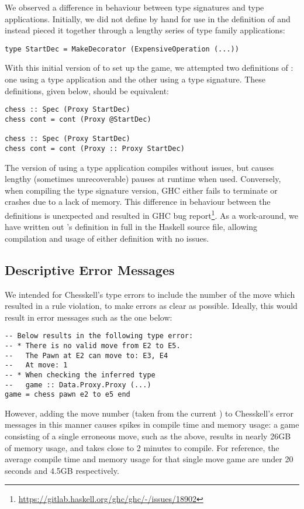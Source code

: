 We observed a difference in behaviour between type signatures and type applications. Initially, we did not define  by hand for use in the definition of  and instead pieced it together through a lengthy series of type family applications:
\begin{lstlisting}
type StartDec = MakeDecorator (ExpensiveOperation (...))
\end{lstlisting}
With this initial version of  to set up the game, we attempted two definitions of : one using a type application and the other using a type signature. These definitions, given below, should be equivalent:
\begin{lstlisting}
chess :: Spec (Proxy StartDec)
chess cont = cont (Proxy @StartDec)

chess :: Spec (Proxy StartDec)
chess cont = cont (Proxy :: Proxy StartDec)
\end{lstlisting}
The version of  using a type application compiles without issues, but causes lengthy (sometimes unrecoverable) pauses at runtime when used. Conversely, when compiling the type signature version, GHC either fails to terminate or crashes due to a lack of memory. This difference in behaviour between the definitions is unexpected and resulted in GHC bug report\footnote{\url{https://gitlab.haskell.org/ghc/ghc/-/issues/18902}}. As a work-around, we have written out 's definition in full in the Haskell source file, allowing compilation and usage of either definition with no issues.

\subsection{Descriptive Error Messages}

We intended for Chesskell's type errors to include the number of the move which resulted in a rule violation, to make errors as clear as possible. Ideally, this would result in error messages such as the one below:

\begin{lstlisting}
-- Below results in the following type error:
-- * There is no valid move from E2 to E5.
--   The Pawn at E2 can move to: E3, E4
--   At move: 1
-- * When checking the inferred type
--   game :: Data.Proxy.Proxy (...)
game = chess pawn e2 to e5 end
\end{lstlisting}

However, adding the move number (taken from the current ) to Chesskell's error messages in this manner causes spikes in compile time and memory usage: a game consisting of a single erroneous move, such as the above, results in nearly 26GB of memory usage, and takes close to 2 minutes to compile. For reference, the average compile time and memory usage for that single move game are under 20 seconds and 4.5GB respectively.

